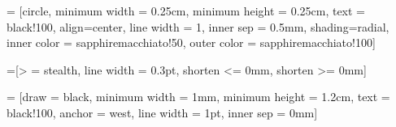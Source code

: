  = [circle, 
					   minimum width = 0.25cm, 
					   minimum height = 0.25cm, 
					   text = black!100, 
					   align=center, 
					   line width = 1, 
					   inner sep = 0.5mm, 
					   shading=radial, 
					   inner color = sapphiremacchiato!50, 
					   outer color = sapphiremacchiato!100]

=[> = stealth, line width = 0.3pt, shorten <= 0mm, shorten >= 0mm]


\newcommand{\slotheight}{1.2cm}
\newcommand{\slotwidth}{1mm}
\newcommand{\numchannels}{10}
\newcommand{\fsperchannel}{5}
\newcommand{\lw}{1pt}

 = [draw = black,
					minimum width = \slotwidth, 
				    minimum height = \slotheight, 
					text = black!100, 
					anchor = west, 
					line width = \lw,
					inner sep = 0mm]

